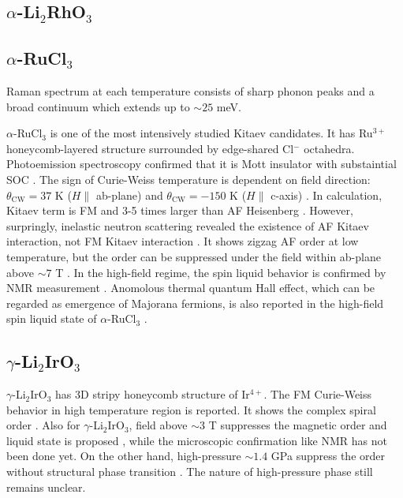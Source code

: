 \subsection{$\alpha$-Li$_2$RhO$_3$}

\subsection{$\alpha$-RuCl$_3$}

Raman spectrum at each temperature consists of sharp phonon peaks and a broad continuum which extends up to $\sim 25$ meV.


$\alpha$-RuCl$_3$ is one of the most intensively studied Kitaev candidates.
It has Ru$^{3+}$ honeycomb-layered structure surrounded by edge-shared Cl$^-$ octahedra.
Photoemission spectroscopy confirmed that it is Mott insulator with substaintial SOC \cite{koitzsch2016j}.
The sign of Curie-Weiss temperature is dependent on field direction: $\theta_{\mathrm{CW}} = 37$ K ($H \parallel$ ab-plane) and
$\theta_{\mathrm{CW}} = -150$ K ($H \parallel$ c-axis) \cite{majumder2015anisotropic}.
In calculation, Kitaev term is FM and 3-5 times larger than AF Heisenberg \cite{yadav2016kitaev}.
However, surpringly, inelastic neutron scattering revealed the existence of AF Kitaev interaction, not FM Kitaev interaction \cite{banerjee2017neutron}.
It shows zigzag AF order at low temperature, but the order can be suppressed under the field within ab-plane above $\sim 7$ T \cite{kasahara2018majorana}.
In the high-field regime, the spin liquid behavior is confirmed by NMR measurement \cite{baek2017evidence}.
Anomolous thermal quantum Hall effect, which can be regarded as emergence of Majorana fermions, is also reported in the high-field spin liquid state of $\alpha$-RuCl$_3$
\cite{kasahara2018majorana}.

\subsection{$\gamma$-Li$_2$IrO$_3$}
$\gamma$-Li$_2$IrO$_3$ \cite{modic2014realization} has 3D stripy honeycomb structure of Ir$^{4+}$.
The FM Curie-Weiss behavior in high temperature region is reported.
It shows the complex spiral order \cite{biffin2014noncoplanar}.
Also for $\gamma$-Li$_2$IrO$_3$, field above $\sim 3$ T suppresses the magnetic order and liquid state is proposed \cite{modic2017robust},
while the microscopic confirmation like NMR has not been done yet.
On the other hand, high-pressure $\sim 1.4$ GPa suppress the order without structural phase transition \cite{breznay2017resonant}.
The nature of high-pressure phase still remains unclear.

